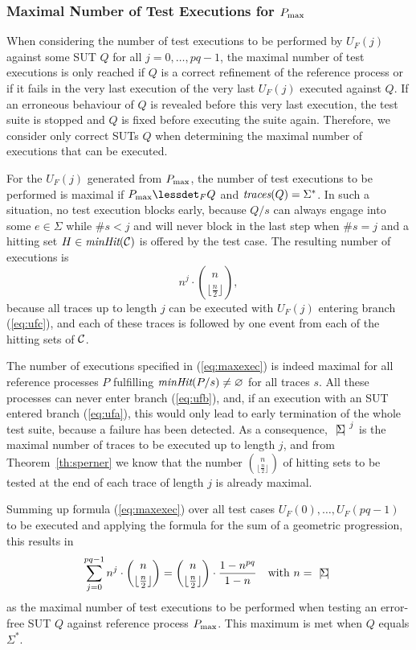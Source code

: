 \subsubsection*{Maximal Number of Test Executions for $P_\text{max}$}

When considering the number of test executions to be performed by 
$U_F(j)$ against some SUT $Q$ for all $j=0,\dots,pq-1$, the maximal number of 
test executions is only reached if $Q$ is a correct refinement of the reference
process or if it fails in the very last execution of the very last $U_F(j)$ 
executed against $Q$. If an erroneous behaviour of $Q$ is revealed before this
very last execution, the test suite is stopped and $Q$ is fixed before
executing the suite again.
Therefore, we consider only correct SUTs $Q$ when determining the
maximal number of executions that can be executed.

For the  $U_F(j)$ generated from $P_\text{max}$, the number of test executions
 to be performed is maximal if $\pmax\lessdet_F Q$ and 
$\text{\it traces}(Q) = \Sigma^*$. In such a situation, no test execution blocks early, because
$Q/s$ can always engage into some $e\in\Sigma$   while $\#s<j$ and will never block
in the last step when $\#s = j$ and a hitting set $H\in\text{\it minHit}({\cal C})$ is 
offered by the test case. The resulting number of executions is
%
\begin{equation}
\label{eq:maxexec}
n^{j}\cdot \binom{n}{\lfloor\frac{n}{2}\rfloor},
\end{equation}
%
because all traces up to length $j$ can be executed with $U_F(j)$ entering branch
(\ref{eq:ufc}), and each of these traces is followed by one event
from each of the hitting sets of ${\cal C}$.

The number of executions specified in (\ref{eq:maxexec}) is indeed maximal for
all reference processes $P$ fulfilling $\text{\it minHit}(P/s)\neq\varnothing$ for all
traces $s$. All these processes can never enter branch (\ref{eq:ufb}), and,
if an execution with an SUT entered branch (\ref{eq:ufa}), this would only lead to early termination of the whole test suite, because a failure has been detected.
As a consequence, ${~|\! \Sigma\!|~}^{j}$ is the maximal number of traces to be executed 
up to length $j$, and from Theorem~\ref{th:sperner} we know that the number
$\binom{n}{\lfloor\frac{n}{2}\rfloor}$ of hitting sets to be tested at the end of each trace of length $j$ is already maximal.

Summing up  formula 
(\ref{eq:maxexec}) over all test cases $U_F(0),\dots,U_F(pq-1)$ to be executed and applying the formula for the sum of a geometric progression,  this results in
%
\begin{equation}\label{eq:pmaxcomplexity}
\sum_{j=0}^{pq-1} n^{j}\cdot \binom{n}{\lfloor\frac{n}{2}\rfloor}  = 
\binom{n}{\lfloor\frac{n}{2}\rfloor}\cdot\frac{1-n^{pq}}{1-n}\quad\text{with $n={~|\! \Sigma\!|~}$}
\end{equation}
%
as the maximal number of test executions to be performed when testing an error-free
SUT $Q$ against reference process $P_\text{max}$. This maximum is met when $Q$ equals $\Sigma^*$.
 



